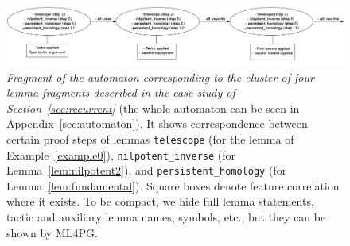 \begin{figure}[t]
\centering 
\includegraphics[scale=.19]{itp6.png}
\caption{\scriptsize{\emph{Fragment of the automaton 
 corresponding to the cluster of four lemma fragments described in the case study of Section~\ref{sec:recurrent}} (the whole automaton can be seen in Appendix~\ref{sec:automaton}). 
It shows correspondence between certain proof steps of lemmas %
\texttt{telescope} (for the lemma of Example~\ref{example0}), \texttt{nilpotent\_inverse} (for Lemma~\ref{lem:nilpotent2}), and \texttt{persistent\_homology} 
(for Lemma~\ref{lem:fundamental}). Square boxes denote feature correlation where it exists. 
To be compact, we  hide full lemma statements, tactic and auxiliary lemma names, symbols, etc., but they can be shown by ML4PG. 
}}\label{fig:automata}
\end{figure}

 


